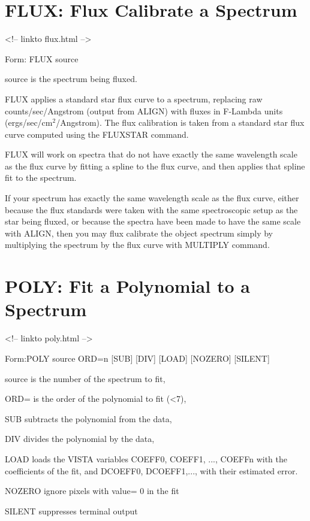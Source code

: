 \section{FLUX: Flux Calibrate a Spectrum}
\begin{rawhtml}
<!-- linkto flux.html -->
\end{rawhtml}
\begin{command}
  \item[Form: FLUX source\hfill]{}
  \item[source]{is the spectrum being fluxed.}
\end{command}

FLUX applies a standard star flux curve to a spectrum, replacing raw
counts/sec/Angstrom (output from ALIGN) with fluxes in F-Lambda units
(ergs/sec/cm$^2$/Angstrom).  The flux calibration is taken from a standard
star flux curve computed using the FLUXSTAR command.  

FLUX will work on spectra that do not have exactly the same wavelength
scale as the flux curve by fitting a spline to the flux curve, and then
applies that spline fit to the spectrum.

If your spectrum has exactly the same wavelength scale as the flux curve,
either because the flux standards were taken with the same spectroscopic
setup as the star being fluxed, or because the spectra have been made to
have the same scale with ALIGN, then you may flux calibrate the object
spectrum simply by multiplying the spectrum by the flux curve with MULTIPLY
command.

\section{POLY: Fit a Polynomial to a Spectrum}
\begin{rawhtml}
<!-- linkto poly.html -->
\end{rawhtml}
\begin{command}
  \item[Form:POLY source ORD=n {[SUB]} {[DIV]} {[LOAD]} {[NOZERO]} 
       {[SILENT]}\hfill]{}
  \item[source]{is the number of the spectrum to fit,}
  \item[ORD=]{is the order of the polynomial to fit (<7),}
  \item[SUB]{subtracts the polynomial from the data,}
  \item[DIV]{divides the polynomial by the data,}
  \item[LOAD]{loads the VISTA variables COEFF0, COEFF1, ...,
       COEFFn with the coefficients of the fit, and
       DCOEFF0, DCOEFF1,..., with their estimated error.}
  \item[NOZERO]{ignore pixels with value= 0 in the fit}
  \item[SILENT]{suppresses terminal output}
\end{command}

